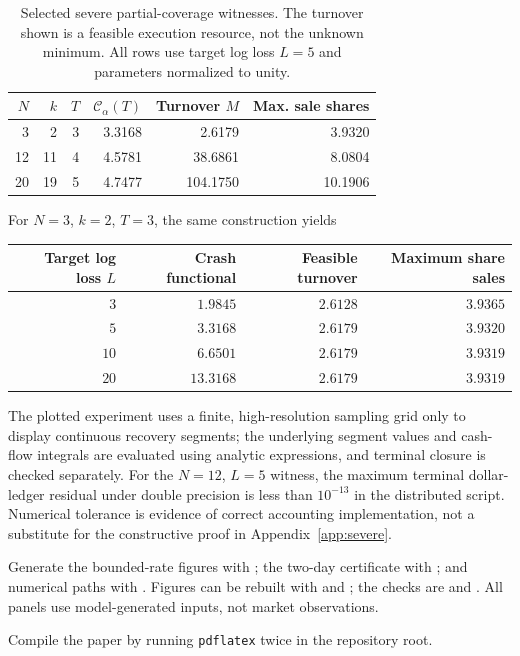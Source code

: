 \documentclass[review,hidelinks,onefignum,onetabnum]{siamonline250211}
\begin{document}
\begin{table}[H]\centering\small
\caption{Selected severe partial-coverage witnesses. The turnover shown is a feasible execution resource, not the unknown minimum. All rows use target log loss $L=5$ and parameters normalized to unity.}\label{tab:witness}
\begin{tabular}{@{}rrrrrr@{}}\toprule
$N$ & $k$ & $T$ & $\mathcal C_\alpha(T)$ & Turnover $M$ & Max. sale shares \\\midrule
3 & 2 & 3 & 3.3168 & 2.6179 & 3.9320\\
12 & 11 & 4 & 4.5781 & 38.6861 & 8.0804\\
20 & 19 & 5 & 4.7477 & 104.1750 & 10.1906\\
\bottomrule\end{tabular}
\end{table}


For $N=3$, $k=2$, $T=3$, the same construction yields
\begin{center}\small
\begin{tabular}{@{}rrrr@{}}\toprule
Target log loss $L$ & Crash functional & Feasible turnover & Maximum share sales\\\midrule
$3$ & $1.9845$ & $2.6128$ & $3.9365$\\
 $5$ & $3.3168$ & $2.6179$ & $3.9320$\\
$10$ & $6.6501$ & $2.6179$ & $3.9319$\\
$20$ & $13.3168$ & $2.6179$ & $3.9319$\\
\bottomrule\end{tabular}
\end{center}
The plotted experiment uses a finite, high-resolution sampling grid only to display continuous recovery segments; the underlying segment values and cash-flow integrals are evaluated using analytic expressions, and terminal closure is checked separately. For the $N=12$, $L=5$ witness, the maximum terminal dollar-ledger residual under double precision is less than $10^{-13}$ in the distributed script. Numerical tolerance is evidence of correct accounting implementation, not a substitute for the constructive proof in Appendix~\ref{app:severe}.

\begingroup\sloppy
Generate the bounded-rate figures with ; the two-day certificate with ; and numerical paths with .
Figures can be rebuilt with  and ; the checks are  and .
All panels use model-generated inputs, not market observations.\par\endgroup
Compile the paper by running \texttt{pdflatex} twice in the repository root.
\end{document}
